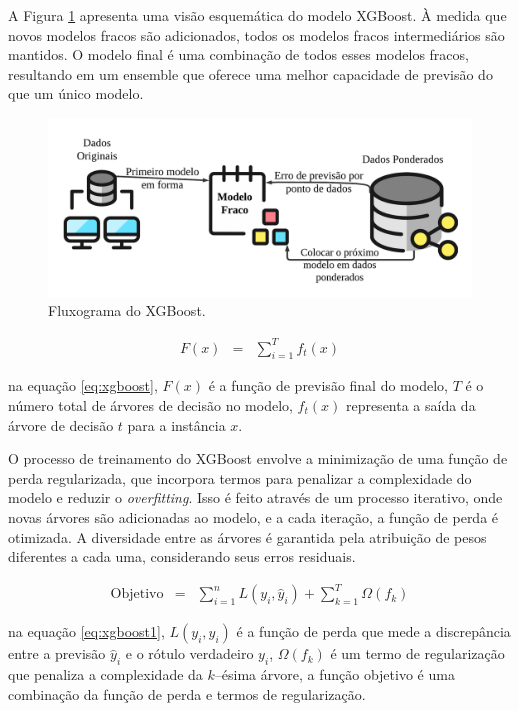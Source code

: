 A Figura \ref{fig:xgboos} apresenta uma visão esquemática do modelo XGBoost. À medida que novos modelos fracos são adicionados, todos os modelos fracos intermediários são mantidos. O modelo final é uma combinação de todos esses modelos fracos, resultando em um ensemble que oferece uma melhor capacidade de previsão do que um único modelo.

\begin{figure}[!htb]
	\centering
	\caption{Fluxograma do XGBoost.}
	\label{fig:xgboos}
	\includegraphics[width=\linewidth]{Modelos/Figuras/xgboos.pdf}
\end{figure}
 

 \begin{eqnarray}
 	 F(x) &=& \sum_{i=1}^{T} f_t(x) \label{eq:xgboost}
 \end{eqnarray}

 
\noindent na equação \eqref{eq:xgboost}, $F(x)$ é a função de previsão final do modelo,  $T$ é o número total de árvores de decisão no modelo, $f_t(x)$  representa a saída da árvore de decisão $ t $ para a instância $ x $.
 
 O processo de treinamento do XGBoost envolve a minimização de uma função de perda regularizada, que incorpora termos para penalizar a complexidade do modelo e reduzir o \textit{overfitting}. Isso é feito através de um processo iterativo, onde novas árvores são adicionadas ao modelo, e a cada iteração, a função de perda é otimizada. A diversidade entre as árvores é garantida pela atribuição de pesos diferentes a cada uma, considerando seus erros residuais.
 

\begin{eqnarray}
	 \text{Objetivo} &=& \sum_{i=1}^{n} L(y_i, \hat{y}_i) + \sum_{k=1}^{T} \Omega(f_k) \label{eq:xgboost1}
\end{eqnarray}

 
 \noindent na equação \eqref{eq:xgboost1}, $ L(y_i, \hat{y}_i) $ é a função de perda que mede a discrepância entre a previsão $ \hat{y}_i $ e o rótulo verdadeiro $ y_i $, $ \Omega(f_k) $ é um termo de regularização que penaliza a complexidade da $ k $--ésima árvore, a função objetivo é uma combinação da função de perda e termos de regularização.
 
